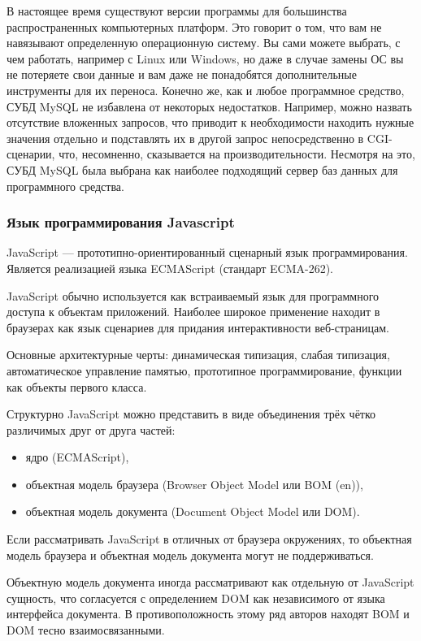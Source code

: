 В настоящее время существуют версии программы для большинства распространенных компьютерных платформ. Это говорит о том, что вам не навязывают определенную операционную систему. Вы сами можете выбрать, с чем работать, например с Linux или Windows, но даже в случае замены ОС вы не потеряете свои данные и вам даже не понадобятся дополнительные инструменты для их переноса.
Конечно же, как и любое программное средство, СУБД MySQL не избавлена от некоторых недостатков. Например, можно назвать отсутствие вложенных запросов, что приводит к необходимости находить нужные значения отдельно и подставлять их в другой запрос непосредственно в CGI-сценарии, что, несомненно, сказывается на производительности.
Несмотря на это, СУБД MySQL была выбрана как наиболее подходящий сервер баз данных для программного средства.

\subsubsection{Язык программирования Javascript}

JavaScript — прототипно-ориентированный сценарный язык программирования. Является реализацией языка ECMAScript (стандарт ECMA-262).

JavaScript обычно используется как встраиваемый язык для программного доступа к объектам приложений. Наиболее широкое применение находит в браузерах как язык сценариев для придания интерактивности веб-страницам.

Основные архитектурные черты: динамическая типизация, слабая типизация, автоматическое управление памятью, прототипное программирование, функции как объекты первого класса.

Структурно JavaScript можно представить в виде объединения трёх чётко различимых друг от друга частей:

\begin{itemize}
	\item ядро (ECMAScript),
	\item объектная модель браузера (Browser Object Model или BOM (en)),
	\item объектная модель документа (Document Object Model или DOM).
\end{itemize}

Если рассматривать JavaScript в отличных от браузера окружениях, то объектная модель браузера и объектная модель документа могут не поддерживаться.

Объектную модель документа иногда рассматривают как отдельную от JavaScript сущность, что согласуется с определением DOM как независимого от языка интерфейса документа. В противоположность этому ряд авторов находят BOM и DOM тесно взаимосвязанными.

